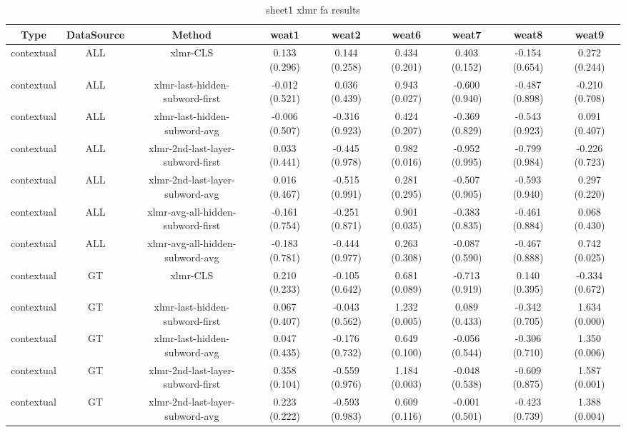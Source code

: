 \begin{sidewaystable}[htb]
    \centering
    \caption{sheet1 xlmr fa results}
    \label{appendix_tab:sheet1_xlmr_fa_results}
    \small
    \begin{tabular}{@{}ccccccccc@{}}
        \toprule
        Type & DataSource & Method & weat1 & weat2 & weat6 & weat7 & weat8 & weat9 \\
        \midrule
        contextual & ALL & xlmr-CLS & 0.133 (0.296) & 0.144 (0.258) & 0.434 (0.201) & 0.403 (0.152) & -0.154 (0.654) & 0.272 (0.244) \\
        contextual & ALL & xlmr-last-hidden-subword-first & -0.012 (0.521) & 0.036 (0.439) & 0.943 (0.027) & -0.600 (0.940) & -0.487 (0.898) & -0.210 (0.708) \\
        contextual & ALL & xlmr-last-hidden-subword-avg & -0.006 (0.507) & -0.316 (0.923) & 0.424 (0.207) & -0.369 (0.829) & -0.543 (0.923) & 0.091 (0.407) \\
        contextual & ALL & xlmr-2nd-last-layer-subword-first & 0.033 (0.441) & -0.445 (0.978) & 0.982 (0.016) & -0.952 (0.995) & -0.799 (0.984) & -0.226 (0.723) \\
        contextual & ALL & xlmr-2nd-last-layer-subword-avg & 0.016 (0.467) & -0.515 (0.991) & 0.281 (0.295) & -0.507 (0.905) & -0.593 (0.940) & 0.297 (0.220) \\
        contextual & ALL & xlmr-avg-all-hidden-subword-first & -0.161 (0.754) & -0.251 (0.871) & 0.901 (0.035) & -0.383 (0.835) & -0.461 (0.884) & 0.068 (0.430) \\
        contextual & ALL & xlmr-avg-all-hidden-subword-avg & -0.183 (0.781) & -0.444 (0.977) & 0.263 (0.308) & -0.087 (0.590) & -0.467 (0.888) & 0.742 (0.025) \\
        contextual & GT & xlmr-CLS & 0.210 (0.233) & -0.105 (0.642) & 0.681 (0.089) & -0.713 (0.919) & 0.140 (0.395) & -0.334 (0.672) \\
        contextual & GT & xlmr-last-hidden-subword-first & 0.067 (0.407) & -0.043 (0.562) & 1.232 (0.005) & 0.089 (0.433) & -0.342 (0.705) & 1.634 (0.000) \\
        contextual & GT & xlmr-last-hidden-subword-avg & 0.047 (0.435) & -0.176 (0.732) & 0.649 (0.100) & -0.056 (0.544) & -0.306 (0.710) & 1.350 (0.006) \\
        contextual & GT & xlmr-2nd-last-layer-subword-first & 0.358 (0.104) & -0.559 (0.976) & 1.184 (0.003) & -0.048 (0.538) & -0.609 (0.875) & 1.587 (0.001) \\
        contextual & GT & xlmr-2nd-last-layer-subword-avg & 0.223 (0.222) & -0.593 (0.983) & 0.609 (0.116) & -0.001 (0.501) & -0.423 (0.739) & 1.388 (0.004) \\

\end{tabular}
\end{sidewaystable}
